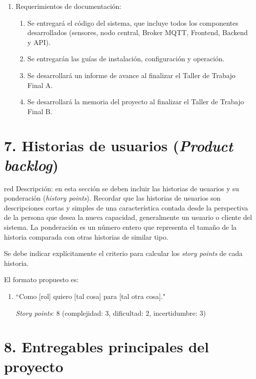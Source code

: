 \documentclass[
11pt, %
codirector, %
]{charter}
\begin{document}
\begin{enumerate}
	\item Requerimientos de documentación:
	      \begin{enumerate}
		      \item Se entregará el código del sistema, que incluye todos los componentes desarrollados (sensores,
		            nodo central, Broker MQTT, Frontend, Backend y API).
		      \item Se entregarán las guías de instalación, configuración y operación.
		      \item Se desarrollará un informe de avance al finalizar el Taller de Trabajo Final A.
		      \item Se desarrollará la memoria del proyecto al finalizar el Taller de Trabajo Final B.
	      \end{enumerate}
\end{enumerate}

\section{7. Historias de usuarios (\textit{Product backlog})}
\label{sec:backlog}

\begin{consigna}{red}
	Descripción: en esta sección se deben incluir las historias de usuarios y su ponderación (\textit{history points}). Recordar que las historias de usuarios son descripciones cortas y simples de una característica contada desde la perspectiva de la persona que desea la nueva capacidad, generalmente un usuario o cliente del sistema. La ponderación es un número entero que representa el tamaño de la historia comparada con otras historias de similar tipo.

	Se debe indicar explícitamente el criterio para calcular los \textit{story points} de cada historia.

	El formato propuesto es:
	\begin{enumerate}
		\item ``Como [rol] quiero [tal cosa] para [tal otra cosa]."

		      \textit{Story points}: 8 (complejidad: 3, dificultad: 2, incertidumbre: 3)
	\end{enumerate}
\end{consigna}

\section{8. Entregables principales del proyecto}
\label{sec:entregables}
\end{document}
